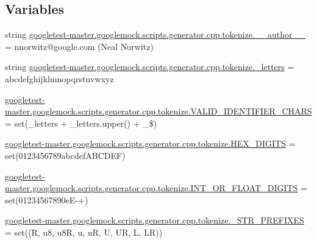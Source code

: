 \subsection*{Variables}
\begin{DoxyCompactItemize}
\item 
string \mbox{\hyperlink{namespacegoogletest-master_1_1googlemock_1_1scripts_1_1generator_1_1cpp_1_1tokenize_aefdd4f3874b9aed4abf7fe1422f73271}{googletest-\/master.\+googlemock.\+scripts.\+generator.\+cpp.\+tokenize.\+\_\+\+\_\+author\+\_\+\+\_\+}} = \textquotesingle{}nnorwitz@google.\+com (Neal Norwitz)\textquotesingle{}
\item 
string \mbox{\hyperlink{namespacegoogletest-master_1_1googlemock_1_1scripts_1_1generator_1_1cpp_1_1tokenize_a26080912b3f9525ba3fe4c4679cf38eb}{googletest-\/master.\+googlemock.\+scripts.\+generator.\+cpp.\+tokenize.\+\_\+letters}} = \textquotesingle{}abcdefghijklmnopqrstuvwxyz\textquotesingle{}
\item 
\mbox{\hyperlink{namespacegoogletest-master_1_1googlemock_1_1scripts_1_1generator_1_1cpp_1_1tokenize_af2cb506273c339c2bdd8e6812791da77}{googletest-\/master.\+googlemock.\+scripts.\+generator.\+cpp.\+tokenize.\+V\+A\+L\+I\+D\+\_\+\+I\+D\+E\+N\+T\+I\+F\+I\+E\+R\+\_\+\+C\+H\+A\+RS}} = set(\+\_\+letters + \+\_\+letters.\+upper() + \textquotesingle{}\+\_\$\textquotesingle{})
\item 
\mbox{\hyperlink{namespacegoogletest-master_1_1googlemock_1_1scripts_1_1generator_1_1cpp_1_1tokenize_a1d62f82c5cc5a9f098ed8e6b76883fe2}{googletest-\/master.\+googlemock.\+scripts.\+generator.\+cpp.\+tokenize.\+H\+E\+X\+\_\+\+D\+I\+G\+I\+TS}} = set(\textquotesingle{}0123456789abcdef\+A\+B\+C\+D\+E\+F\textquotesingle{})
\item 
\mbox{\hyperlink{namespacegoogletest-master_1_1googlemock_1_1scripts_1_1generator_1_1cpp_1_1tokenize_ae00b1d087fb2181dead435788a2705ca}{googletest-\/master.\+googlemock.\+scripts.\+generator.\+cpp.\+tokenize.\+I\+N\+T\+\_\+\+O\+R\+\_\+\+F\+L\+O\+A\+T\+\_\+\+D\+I\+G\+I\+TS}} = set(\textquotesingle{}01234567890e\+E-\/+\textquotesingle{})
\item 
\mbox{\hyperlink{namespacegoogletest-master_1_1googlemock_1_1scripts_1_1generator_1_1cpp_1_1tokenize_a237f1d53f4d2c934d154ae6cd26a0cc7}{googletest-\/master.\+googlemock.\+scripts.\+generator.\+cpp.\+tokenize.\+\_\+\+S\+T\+R\+\_\+\+P\+R\+E\+F\+I\+X\+ES}} = set((\textquotesingle{}R\textquotesingle{}, \textquotesingle{}u8\textquotesingle{}, \textquotesingle{}u8R\textquotesingle{}, \textquotesingle{}u\textquotesingle{}, \textquotesingle{}uR\textquotesingle{}, \textquotesingle{}U\textquotesingle{}, \textquotesingle{}UR\textquotesingle{}, \textquotesingle{}L\textquotesingle{}, \textquotesingle{}LR\textquotesingle{}))

\end{DoxyCompactItemize}
